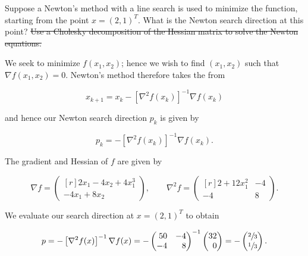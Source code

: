 Suppose a Newton's method with a line search is used to minimize the function, starting from the point $x = (2, 1)^T$.
What is the Newton search direction at this point? \sout{Use a Cholesky decomposition of the Hessian matrix to solve the
Newton equations.}

\begin{solution}
    We seek to minimize $f(x_1, x_2)$; hence we wish to find $(x_1, x_2)$ such that $\nabla f(x_1, x_2) = 0$. Newton's 
    method therefore takes the from
    
    $$
    x_{k+1} = x_{k} - \left[ \nabla^2 f(x_k) \right]^{-1} \nabla f(x_k)
    $$

    and hence our Newton search direction $p_k$ is given by

    $$
    p_k = - \left[ \nabla^2 f(x_k) \right]^{-1} \nabla f(x_k).
    $$

    The gradient and Hessian of $f$ are given by

    $$
    \nabla f = \begin{pmatrix*}[r]
         2 x_1 - 4 x_2 + 4 x_1^3 \\
        -4 x_1 + 8 x_2 
    \end{pmatrix*}, \qquad \nabla^2 f = \begin{pmatrix*}[r]
         2 + 12 x_1^2 & -4 \\
        -4            &  8
    \end{pmatrix*}.
    $$

    We evaluate our search direction at $x = (2, 1)^T$ to obtain

    $$
    p = - \left[ \nabla^2 f(x) \right]^{-1} \nabla f(x) = - \begin{pmatrix*}[r]
        50 & -4 \\
        -4 &  8
    \end{pmatrix*}^{-1} \begin{pmatrix*}[r]
        32 \\
        0
    \end{pmatrix*} = -\begin{pmatrix*}[r]
        \sfrac{2}{3} \\
        \sfrac{1}{3}
    \end{pmatrix*}.
    $$
    \ \\
\end{solution}
